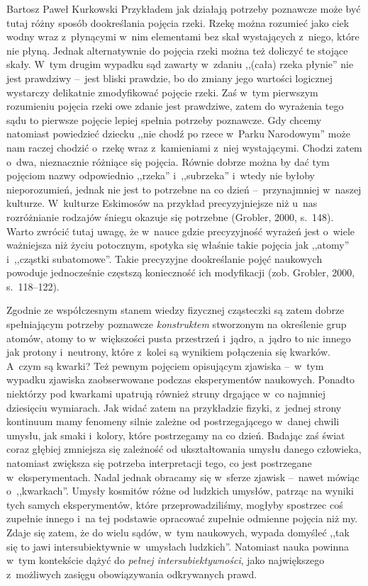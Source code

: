 \begin{artplenv}{Bartosz Paweł Kurkowski}
Przykładem jak działają potrzeby poznawcze może być tutaj różny sposób dookreślania pojęcia rzeki. Rzekę można rozumieć
jako ciek wodny wraz z~płynącymi w~nim elementami bez skał wystających z~niego, które nie płyną. Jednak alternatywnie
do pojęcia rzeki można też doliczyć te stojące skały. W~tym drugim wypadku sąd zawarty w~zdaniu ,,(cała) rzeka płynie''
nie jest prawdziwy --~jest bliski prawdzie, bo do zmiany jego wartości logicznej wystarczy delikatnie zmodyfikować
pojęcie rzeki. Zaś w~tym pierwszym rozumieniu pojęcia rzeki owe zdanie jest prawdziwe, zatem do wyrażenia tego sądu to
pierwsze pojęcie lepiej spełnia potrzeby poznawcze. Gdy chcemy natomiast powiedzieć dziecku ,,nie chodź po rzece w~Parku
Narodowym'' może nam raczej chodzić o~rzekę wraz z~kamieniami z~niej wystającymi. Chodzi zatem o~dwa, nieznacznie
różniące się pojęcia. Równie dobrze można by dać tym pojęciom nazwy odpowiednio ,,rzeka'' i~,,subrzeka'' i~wtedy nie byłoby
nieporozumień, jednak nie jest to potrzebne na co dzień --~przynajmniej w~naszej kulturze. W~kulturze Eskimosów na
przykład precyzyjniejsze niż u~nas rozróżnianie rodzajów śniegu okazuje się potrzebne
\label{ref:RND35uGBnBgaS}(Grobler, 2000, s.~148). Warto zwrócić tutaj uwagę, że w~nauce gdzie precyzyjność wyrażeń jest
o~wiele ważniejsza niż życiu potocznym, spotyka się właśnie takie pojęcia jak ,,atomy'' i~,,cząstki subatomowe''. Takie
precyzyjne dookreślanie pojęć naukowych powoduje jednocześnie częstszą konieczność ich modyfikacji
\label{ref:RNDP1pytzI4q3}(zob. Grobler, 2000, s.~118–122).


Zgodnie ze współczesnym stanem wiedzy fizycznej cząsteczki są zatem dobrze spełniającym potrzeby poznawcze
\textit{konstruktem} stworzonym na określenie grup atomów, atomy to w~większości pusta przestrzeń i~jądro, a~jądro to
nic innego jak protony i~neutrony, które z~kolei są wynikiem połączenia się kwarków. A~czym są kwarki? Też pewnym
pojęciem opisującym zjawiska --~w~tym wypadku zjawiska zaobserwowane podczas eksperymentów naukowych. Ponadto niektórzy
pod kwarkami upatrują również struny drgające w~co najmniej dziesięciu wymiarach. Jak widać zatem na przykładzie
fizyki, z~jednej strony kontinuum mamy fenomeny silnie zależne od postrzegającego w~danej chwili umysłu, jak
smaki i~kolory, które postrzegamy na co dzień. Badając zaś świat coraz głębiej zmniejsza się zależność od ukształtowania umysłu
danego człowieka, natomiast zwiększa się potrzeba interpretacji tego, co jest postrzegane w~eksperymentach. Nadal
jednak obracamy się w~sferze zjawisk --~nawet mówiąc o~,,kwarkach''. Umysły kosmitów różne od ludzkich umysłów, patrząc na
wyniki tych samych eksperymentów, które przeprowadziliśmy, mogłyby spostrzec coś zupełnie innego i~na tej podstawie
opracować zupełnie odmienne pojęcia niż my. Zdaje się zatem, że do wielu sądów, w~tym naukowych, wypada domyśleć ,,tak
się to jawi intersubiektywnie w~umysłach ludzkich''. Natomiast nauka powinna w~tym kontekście dążyć do \textit{pełnej
intersubiektywności}, jako największego z~możliwych zasięgu obowiązywania odkrywanych prawd.



\end{artplenv}
